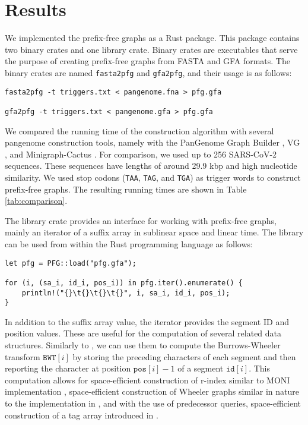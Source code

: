 \section{Results}
We implemented the prefix-free graphs as a Rust package.
This package contains two binary crates and one library crate.
Binary crates are executables that serve the purpose of creating prefix-free graphs from FASTA and GFA formats.
The binary crates are named \texttt{fasta2pfg} and \texttt{gfa2pfg}, and their usage is as follows:

\begin{verbatim}
fasta2pfg -t triggers.txt < pangenome.fna > pfg.gfa

gfa2pfg -t triggers.txt < pangenome.gfa > pfg.gfa
\end{verbatim}

We compared the running time of the construction algorithm with several pangenome construction tools, namely with the PanGenome Graph Builder \cite{garrison2023building}, VG \cite{garrison2018variation}, and Minigraph-Cactus \cite{hickey2023pangenome}.
For comparison, we used up to 256 SARS-CoV-2 sequences.
These sequences have lengths of around 29.9 kbp and high nucleotide similarity.
We used stop codons (\texttt{TAA}, \texttt{TAG}, and \texttt{TGA}) as trigger words to construct prefix-free graphs.
The resulting running times are shown in Table \ref{tab:comparison}.



The library crate provides an interface for working with prefix-free graphs, mainly an iterator of a suffix array in sublinear space and linear time.
The library can be used from within the Rust programming language as follows:

\begin{verbatim}
let pfg = PFG::load("pfg.gfa");

for (i, (sa_i, id_i, pos_i)) in pfg.iter().enumerate() {
    println!("{}\t{}\t{}\t{}", i, sa_i, id_i, pos_i);
}
\end{verbatim}

In addition to the suffix array value, the iterator provides the segment ID and position values.
These are useful for the computation of several related data structures.
Similarly to \citet{2019boucher}, we can use them to compute the Burrows-Wheeler transform $\texttt{BWT}[i]$ by storing the preceding characters of each segment and then reporting the character at position $\texttt{pos}[i]-1$ of a segment $\texttt{id}[i]$.
This computation allows for space-efficient construction of r-index \cite{gagie2020fully} similar to MONI implementation \cite{rossi2022moni}, space-efficient construction of Wheeler graphs similar in nature to the implementation in \citet{2022pfwg}, and with the use of predecessor queries, space-efficient construction of a tag array introduced in \citet{2022maria}.

